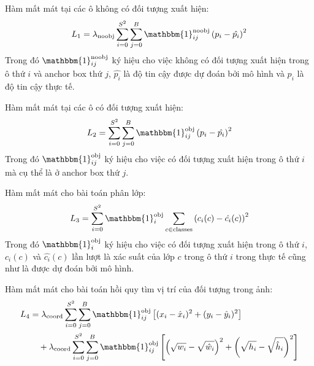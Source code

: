 \documentclass[../thesis.tex]{subfiles}
\begin{document}
\begin{itemize}
    \begin{item}
        Hàm mất mát tại các ô không có đối tượng xuất hiện:
        \begin{align*}
            L_1 = \lambda_\text{noobj}\displaystyle\sum_{i=0}^{S^2}\sum_{j=0}^{B}{\mathbbm{1}^\text{noobj}_{ij}\left(p_i-\hat{p_i}\right)^2}
        \end{align*}
        Trong đó $\mathbbm{1}^\text{noobj}_{ij}$ ký hiệu cho việc không có đối tượng xuất hiện trong ô thứ $i$ và anchor box thứ $j$, $\hat{p_i}$ là độ tin cậy được dự đoán bởi mô hình và $p_i$ là độ tin cậy thực tế.
    \end{item}
    
    \begin{item}
        Hàm mất mát tại các ô có đối tượng xuất hiện:
        \begin{align*}
            L_2 = \displaystyle\sum_{i=0}^{S^2}\sum_{j=0}^{B}{\mathbbm{1}^\text{obj}_{ij}\left(p_i-\hat{p_i}\right)^2}
        \end{align*}
        Trong đó $\mathbbm{1}^\text{obj}_{ij}$ ký hiệu cho việc có đối tượng xuất hiện trong ô thứ $i$ mà cụ thể là ở anchor box thứ $j$.
    \end{item}
  
    \begin{item}
        Hàm mất mát cho bài toán phân lớp:
        \begin{align*}
            L_3 = \displaystyle\sum_{i=0}^{S^2}{\mathbbm{1}^\text{obj}_i}\sum_{c \in \text{classes}}{\left(c_i(c) - \hat{c_i}(c)\right)^2}
        \end{align*}
        Trong đó $\mathbbm{1}^\text{obj}_{i}$ ký hiệu cho việc có đối tượng xuất hiện trong ô thứ $i$, $c_i(c)$ và $\hat{c_i}(c)$ lần lượt là xác suất của lớp $c$ trong ô thứ $i$ trong thực tế cũng như là được dự đoán bởi mô hình.
    \end{item}

    \begin{item}
    Hàm mất mát cho bài toán hồi quy tìm vị trí của đối tượng trong ảnh:
    \begin{align*}
        L_4 &= \lambda_\text{coord}\displaystyle\sum_{i=0}^{S^2}\sum_{j=0}^{B}{\mathbbm{1}^\text{obj}_{ij}\left[(x_i - \hat{x}_i)^2 + (y_i - \hat{y}_i)^2\right]}\\
        &\quad + \lambda_\text{coord}\displaystyle\sum_{i=0}^{S^2}\sum_{j=0}^{B}{\mathbbm{1}^\text{obj}_{ij}}\left[\left(\sqrt{w_i} - \sqrt{\hat{w}_i}\right)^2 + \left(\sqrt{h_i} - \sqrt{\hat{h}_i}\right)^2\right]
    \end{align*}
    \end{item}
\end{itemize}
\end{document}
